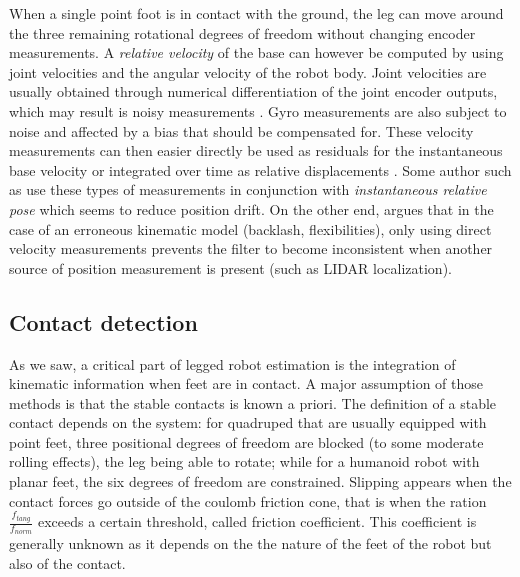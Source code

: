 When a single point foot is in contact with the ground, the leg can move around the three remaining rotational degrees of freedom without changing encoder measurements.
A \textit{relative velocity} of the base can however be computed by using joint velocities and the angular velocity of the robot body. 
Joint velocities are usually obtained through numerical differentiation of the joint encoder outputs, which may result is noisy measurements \cite{rotella2016imu}.
Gyro measurements are also subject to noise and affected by a bias that should be compensated for. These velocity measurements can then easier directly be used as
residuals for the instantaneous base velocity \cite{bloesch2013stateSlippery,bledt2018cheetah} or integrated over time as relative 
displacements \cite{ma2012robust, wisth2020preintegrated}. Some author such as \cite{bloesch2013stateSlippery, bledt2018cheetah} 
use these types of measurements in conjunction with \textit{instantaneous relative pose} which seems to reduce position drift. On the other end,
\cite{fallon2014drift} argues that in the case of an erroneous kinematic model (backlash, flexibilities), only using direct velocity measurements
prevents the filter to become inconsistent when another source of position measurement is present (such as LIDAR localization).  


\subsection{Contact detection}
As we saw, a critical part of legged robot estimation is the integration of kinematic information when feet are in contact. A major
assumption of those methods is that the stable contacts is known a priori. The definition of a stable contact depends on the system: for quadruped that 
are usually equipped with point feet, three positional degrees of freedom are blocked (to some moderate rolling effects), the leg being able to rotate; while for a humanoid robot with
planar feet, the six degrees of freedom are constrained. Slipping appears when the contact forces go outside of the coulomb friction cone, that is when the ration $\frac{f_{tang}}{f_{norm}}$
exceeds a certain threshold, called friction coefficient. This coefficient is generally unknown as it depends on the the nature of the feet of the robot but also of the contact.

